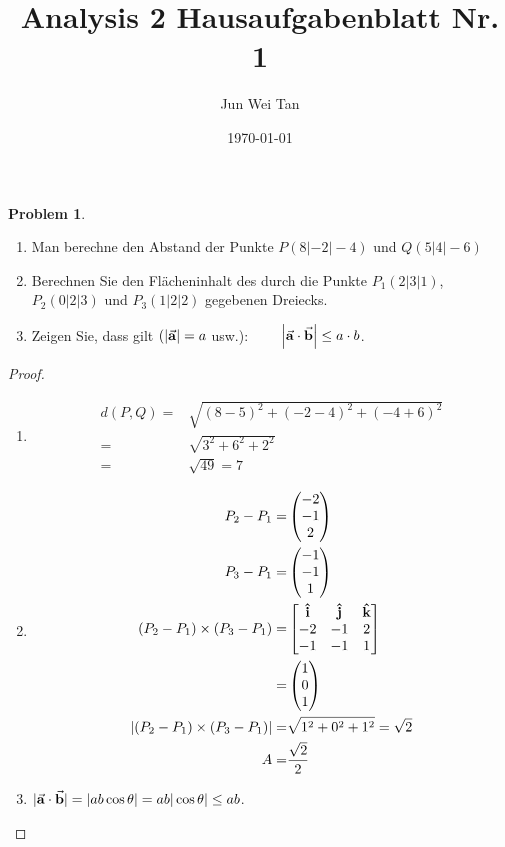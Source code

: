 \documentclass[prb,12pt]{revtex4-2}
\theoremstyle{definition}
\newtheorem{Problem}{Problem}
\theoremstyle{definition}
\newenvironment{parts}{\begin{enumerate}[label=(\alph*)]}{\end{enumerate}}
\begin{document}
	\title{Analysis 2 Hausaufgabenblatt Nr. 1}
	\author{Jun Wei Tan}
	\date{\today}
	\maketitle

\begin{Problem}
	\begin{parts}
		\item Man berechne den Abstand der Punkte $P (8| - 2| - 4)$ und $Q(5|4| - 6)$
		\item Berechnen Sie den Fl\"{a}cheninhalt des durch die Punkte $P_1(2|3|1)$, $P_2(0|2|3)$ und $P_3(1|2|2)$ gegebenen Dreiecks.
		\item Zeigen Sie, dass gilt $(|\va a|=a$ usw.): $\qquad \left| \va a \cdot \va b \right| \le a \cdot b$.
	\end{parts}
\end{Problem}
\begin{proof}
	\begin{parts}
		\item
	\begin{align*}
		d(P, Q)=&\sqrt{(8-5)^2+(-2-4)^2+(-4+6)^2}\\
		=& \sqrt{3^2+6^2+2^2}\\
		=&\sqrt{49} =7
	\end{align*}
\item
	{\allowdisplaybreaks
	\begin{align*}
		P_2-P_1=&\begin{pmatrix} -2 \\ -1 \\ 2 \end{pmatrix} \\
		P_3-P_1=& \begin{pmatrix} -1 \\ -1 \\ 1 \end{pmatrix}\\
		(P_2-P_1)\times (P_3-P_1)=&\begin{bmatrix} \vu i & \vu j & \vu k \\ -2 & -1 & 2 \\ -1 & -1 & 1 \end{bmatrix} \\
		=& \begin{pmatrix} 1 \\ 0 \\ 1 \end{pmatrix}\\
		|(P_2-P_1)\times (P_3-P_1)|=& \sqrt{1^2+0^2+1^2} =\sqrt{2}\\
		A=& \frac{\sqrt{2} }{2}
\end{align*}}
\item $|\va a \cdot \va b|=|ab\cos\theta|=ab|\cos\theta| \le ab$. \qedhere
	\end{parts}
\end{proof}
\end{document}
